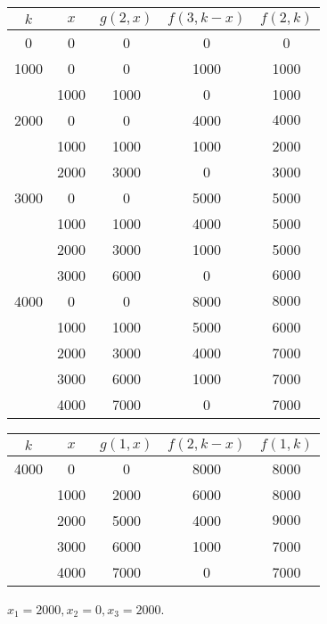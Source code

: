 \documentclass[twoside]{article}
\begin{document}
\begin{ejercicio}{1}
\begin{solucion}
\begin{center}
\begin{tabular}{|c| c| c| c| c|}
\hline
$k$ & $x$ & $g(2,x)$ & $f(3,k-x)$ & $f(2,k)$\\
\hline
0   &  0  & 0        &  0      &  0\\
\hline
\hline
1000    &  0  & 0       &   1000 & 1000\\
     &  1000  & 1000 & 0         & 1000\\
     \hline
     \hline
2000 &  0     & 0        &  4000 & $\boxed{4000}$\\
  &  1000     & 1000     & 1000  & 2000\\
  &  2000     & 3000     &  0    & 3000\\
  \hline
  \hline
3000 & 0	& 0	& 5000 & 5000\\
	 & 1000 & 1000 & 4000 & 5000\\
	 & 2000 & 3000 & 1000 & 5000\\
	 & 3000 & 6000 & 0  & $\boxed{6000}$\\
\hline
\hline
4000 & 0   & 0 & 8000 & $\boxed{8000}$\\
	 & 1000 & 1000 & 5000 & 6000\\
	 & 2000 & 3000 & 4000 & 7000\\
	 & 3000 & 6000 & 1000 & 7000\\
	 & 4000 & 7000 & 0 & 7000\\
	 \hline
\end{tabular}

\vspace{0.5em}

\begin{tabular}{|c|c|c|c|c|}
\hline
$k$ & $x$ & $g(1,x)$ & $f(2,k-x)$ &$f(1,k)$\\
\hline
4000 & 0   & 0       &  8000 & 8000\\
	 & 1000 & 2000   &   6000 & 8000 \\
	 & 2000 &  5000 &   4000 & $\boxed{9000}$\\
	 & 3000 & 6000  &   1000 & 7000\\
	 & 4000 & 7000 &   0     & 7000\\
	 \hline
\end{tabular}

\vspace{0.5em}
\end{center}

$x_1=2000, x_2=0, x_3=2000$.
\end{solucion}
\end{ejercicio}
\end{document}
